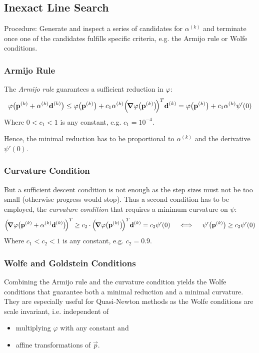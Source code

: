 		\subsection{Inexact Line Search}
			Procedure: Generate and inspect a series of candidates for \(\alpha^{(k)}\) and terminate once one of the candidates fulfills specific criteria, e.g. the Armijo rule or Wolfe conditions.
			
			\subsubsection{Armijo Rule}
				The \emph{Armijo rule} guarantees a sufficient reduction in \(\varphi\):
				\begin{align*}
					\varphi\big(\boldsymbol{\mathrm{p}}^{(k)} + \alpha^{(k)} \boldsymbol{\mathrm{d}}^{(k)}\big) \leq \varphi\big(\boldsymbol{\mathrm{p}}^{(k)}\big) + c_1 \alpha^{(k)} \Big(\! \grad{\varphi}\big(\boldsymbol{\mathrm{p}}^{(k)}\big) \!\Big)^T \boldsymbol{\mathrm{d}}^{(k)} = \varphi\big(\boldsymbol{\mathrm{p}}^{(k)}\big) + c_1 \alpha^{(k)} \psi'(0)
				\end{align*}
				Where \( 0 < c_1 < 1 \) is any constant, e.g. \( c_1 = 10^{-4} \).
				
				Hence, the minimal reduction has to be proportional to \(\alpha^{(k)}\) and the derivative \( \psi'(0) \).
			
			\subsubsection{Curvature Condition}
				But a sufficient descent condition is not enough as the step sizes must not be too small (otherwise progress would stop). Thus a second condition has to be employed, the \emph{curvature condition} that requires a minimum curvature on \(\psi\):
				\begin{align*}
					\Big(\!\grad{\varphi}\big(\boldsymbol{\mathrm{p}}^{(k)} + \alpha^{(k)} \boldsymbol{\mathrm{d}}^{(k)}\big)\!\Big)^T \geq c_2 \cdot \Big(\! \grad{\varphi}\big(\boldsymbol{\mathrm{p}}^{(k)}\big) \!\Big)^T \boldsymbol{\mathrm{d}}^{(k)} = c_2 \psi'(0) \quad\iff\quad \psi'\big(\boldsymbol{\mathrm{p}}^{(k)}\big) \geq c_2 \psi'(0)
				\end{align*}
				Where \( c_1 < c_2 < 1 \) is any constant, e.g. \( c_2 = 0.9 \).
			
			\subsubsection{Wolfe and Goldstein Conditions}
				Combining the Armijo rule and the curvature condition yields the Wolfe conditions that guarantee both a minimal reduction and a minimal curvature. They are especially useful for Quasi-Newton methods as the Wolfe conditions are scale invariant, i.e. independent of
				\begin{itemize}
					\item multiplying \(\varphi\) with any constant and
					\item affine transformations of \(\vec{p}\).
				\end{itemize}
			

